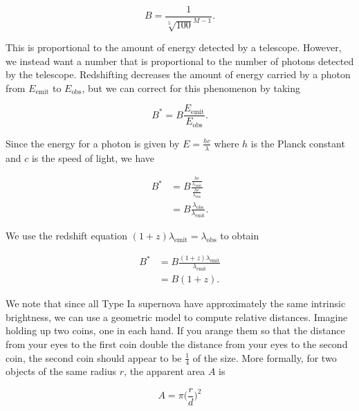 \documentclass{article}
\begin{document}
\begin{equation}
  B = \frac{1}{\sqrt[5]{100}^{M - 1}}.
\end{equation}

This is proportional to the amount of energy detected by a telescope. However,
we instead want a number that is proportional to the number of photons detected
by the telescope. Redshifting decreases the amount of energy carried by a
photon from $E_{\text{emit}}$ to $E_{\text{obs}}$, but we can correct for this
phenomenon by taking

\begin{equation}
  B^{*} = B \frac{E_{\text{emit}}}{E_{\text{obs}}}.
\end{equation}

Since the energy for a photon is given by $E = \frac{hc}{\lambda}$ where $h$ is
the Planck constant and $c$ is the speed of light, we have

\begin{equation}
\begin{aligned}
  B^{*} &= B \frac{\frac{hc}{\lambda_{\text{emit}}}}{\frac{hc}{\lambda_{\text{obs}}}} \\
        &= B \frac{\lambda_{\text{obs}}}{\lambda_{\text{emit}}}.
\end{aligned}
\end{equation}

We use the redshift equation $(1 + z)\lambda_{\text{emit}} =
\lambda_{\text{obs}}$ to obtain

\begin{equation}
\begin{aligned}
  B^{*} &= B \frac{(1 + z)\lambda_{\text{emit}}}{\lambda_{\text{emit}}} \\
        &= B(1 + z).
\end{aligned}
\end{equation}

We note that since all Type Ia supernova have approximately the same intrinsic
brightness, we can use a geometric model to compute relative distances. Imagine
holding up two coins, one in each hand.  If you arange them so that the
distance from your eyes to the first coin double the distance from your eyes to
the second coin, the second coin should appear to be $\frac{1}{4}$ of the size.
More formally, for two objects of the same radius $r$, the apparent area $A$
is

\begin{equation}
  A = \pi \bigg(\frac{r}{d}\bigg)^2
\end{equation}
\end{document}
